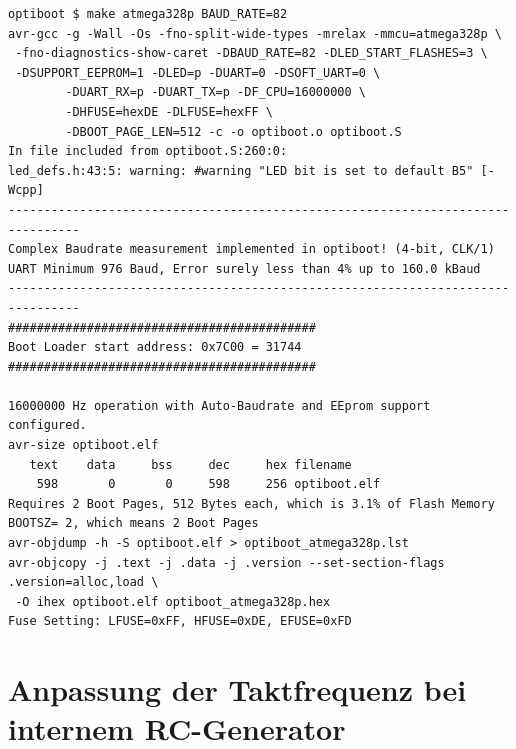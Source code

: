 \begin{verbatim}
optiboot $ make atmega328p BAUD_RATE=82
avr-gcc -g -Wall -Os -fno-split-wide-types -mrelax -mmcu=atmega328p \
 -fno-diagnostics-show-caret -DBAUD_RATE=82 -DLED_START_FLASHES=3 \
 -DSUPPORT_EEPROM=1 -DLED=p -DUART=0 -DSOFT_UART=0 \
        -DUART_RX=p -DUART_TX=p -DF_CPU=16000000 \
        -DHFUSE=hexDE -DLFUSE=hexFF \
        -DBOOT_PAGE_LEN=512 -c -o optiboot.o optiboot.S
In file included from optiboot.S:260:0:
led_defs.h:43:5: warning: #warning "LED bit is set to default B5" [-Wcpp]
--------------------------------------------------------------------------------
Complex Baudrate measurement implemented in optiboot! (4-bit, CLK/1)
UART Minimum 976 Baud, Error surely less than 4% up to 160.0 kBaud
--------------------------------------------------------------------------------
###########################################
Boot Loader start address: 0x7C00 = 31744
###########################################

16000000 Hz operation with Auto-Baudrate and EEprom support configured.
avr-size optiboot.elf
   text	   data	    bss	    dec	    hex	filename
    598	      0	      0	    598	    256	optiboot.elf
Requires 2 Boot Pages, 512 Bytes each, which is 3.1% of Flash Memory
BOOTSZ= 2, which means 2 Boot Pages
avr-objdump -h -S optiboot.elf > optiboot_atmega328p.lst
avr-objcopy -j .text -j .data -j .version --set-section-flags .version=alloc,load \
 -O ihex optiboot.elf optiboot_atmega328p.hex
Fuse Setting: LFUSE=0xFF, HFUSE=0xDE, EFUSE=0xFD
\end{verbatim}


\section{Anpassung der Taktfrequenz bei internem RC-Generator}

